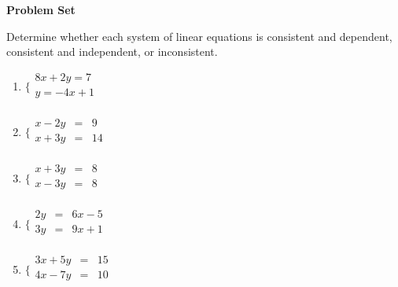 \textbf{Problem Set}

\vspce

Determine whether each system of linear equations is consistent and dependent, consistent and independent, or inconsistent. 
\begin{enumerate}[label = \arabic*. ]
\item \hspce $\bigg\{
\begin{array}{l}
8x + 2y =7 \\
y=-4x+1  \\
\end{array}$

\vspce 
\item \hspce $\bigg\{
\begin{array}{lcl}
x - 2y & = & 9 \\
x + 3y & = & 14 \\
\end{array}$
\vspce 
\item \hspce $\bigg\{
\begin{array}{lcl}
x + 3y & = & 8 \\
x - 3y & = & 8 \\
\end{array}$
\vspce 
\item \hspce $\bigg\{
\begin{array}{lcl}
2y & = & 6x  - 5 \\
3y & = & 9x  + 1 \\
\end{array}$
\vspce 
\item \hspce $\bigg\{
\begin{array}{lcl}
3x + 5y&=&15  \\
4x - 7y& = &10 \\
\end{array}$
\end{enumerate}  



